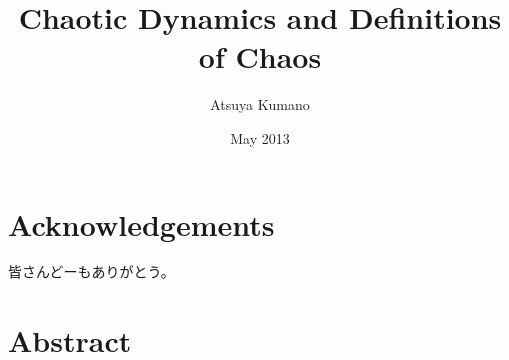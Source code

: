 \documentclass[12pt,twoside]{reedthesis}
\title{Chaotic Dynamics and Definitions of Chaos}
\author{Atsuya Kumano}
\date{May 2013}
\begin{document}
\maketitle
\frontmatter %
\pagestyle{empty} %

\chapter*{Acknowledgements}
皆さんどーもありがとう。

\tableofcontents

\chapter*{Abstract}

% 

\mainmatter %
\pagestyle{fancyplain} %




















\appendix




\backmatter %

\renewcommand{\bibname}{References}

\nocite{*}


\printindex
\end{document}
